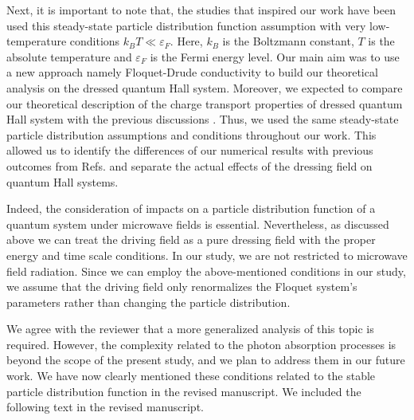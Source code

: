 \documentclass{article}
\begin{document}
Next, it is important to note that, the studies \cite{wackerl20,wackerlthesis20,dini16,endo09} that inspired our work have been used this steady-state particle distribution function assumption with very low-temperature conditions $k_B T \ll \varepsilon_F$. Here, $k_B$ is the Boltzmann constant, $T$ is the absolute temperature and $\varepsilon_F$ is the Fermi energy level.
Our main aim was to use a new approach namely Floquet-Drude conductivity \cite{wackerl20} to build our theoretical analysis on the dressed quantum Hall system.
Moreover, we expected to compare our theoretical description of the charge transport properties of dressed quantum Hall system with the previous discussions \cite{dini16,endo09}. Thus, we used the same steady-state particle distribution assumptions and conditions throughout our work.
This allowed us to identify the differences of our numerical results with previous outcomes from Refs. \cite{dini16,endo09} and separate the actual effects of the dressing field on quantum Hall systems.

Indeed, the consideration of impacts on a particle distribution function of a quantum system under microwave fields is essential. Nevertheless, as discussed above we can treat the driving field as a pure dressing field with the proper energy and time scale conditions. In our study, we are not restricted to microwave field radiation. Since we can employ the above-mentioned conditions in our study, we assume that the driving field only renormalizes the Floquet system's parameters rather than changing the particle distribution.

We agree with the reviewer that a more generalized analysis of this topic is required. However, the complexity related to the photon absorption processes is beyond the scope of the present study, and we plan to address them in our future work. We have now clearly mentioned these conditions related to the stable particle distribution function in the revised manuscript. We included the following text in the revised manuscript.
\end{document}

